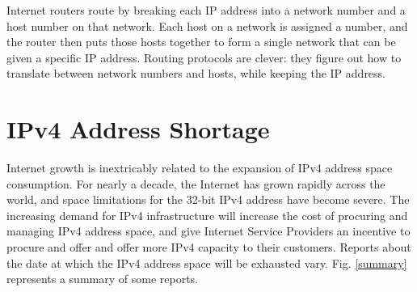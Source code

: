 \documentclass[conference,12pt]{IEEEtran}
\begin{document}
Internet routers route by breaking each IP address into a network number and a host number on that network. Each host on a network is assigned a number, and the router then puts those hosts together to form a single network that can be given a specific IP address. Routing protocols are clever: they figure out how to translate between network numbers and hosts, while keeping the IP address.

\section{IPv4 Address Shortage}
Internet growth is inextricably related to the expansion of IPv4 address space consumption. For nearly a decade, the Internet has grown rapidly across the world, and space limitations for the 32-bit IPv4 address have become severe. The increasing demand for IPv4 infrastructure will increase the cost of procuring and managing IPv4 address space, and give Internet Service Providers an incentive to procure and offer and offer more IPv4 capacity to their customers. Reports about the date at which the IPv4 address space will be exhausted vary. Fig. \ref{summary} represents a summary of some reports.
\end{document}

